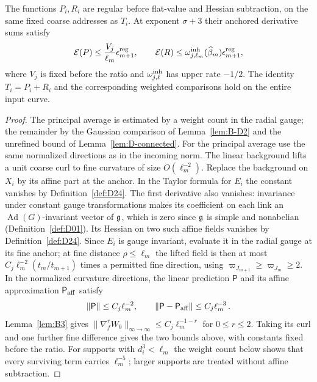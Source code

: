 \begin{lemma}\label{lem:D-inherited}
The functions $P_i,R_i$ are regular before flat-value and Hessian subtraction, on the same fixed coarse addresses as $T_i$. At exponent $\sigma+3$ their anchored derivative sums satisfy
\begin{equation*}
\mathcal E(P)\le\frac{V_j}{\ell_m}\epsilon_{m+1}^{\rm reg},\qquad
\mathcal E(R)\le \omega_{j,\ell_m}^{\rm inh}(\widehat{\beta}_m)\epsilon_{m+1}^{\rm reg},
\end{equation*}
where $V_j$ is fixed before the ratio and $\omega_{j,\ell}^{\rm inh}$ has upper rate $-1/2$. The identity $T_i=P_i+R_i$ and the corresponding weighted comparisons hold on the entire input curve.
\end{lemma}
\begin{proof}
The principal average is estimated by a weight count in the radial gauge; the remainder by the Gaussian comparison of Lemma~\ref{lem:B-D2} and the unrefined bound of Lemma~\ref{lem:D-connected}. For the principal average use the same normalized directions as in the incoming norm. The linear background lifts a unit coarse curl to fine curvature of size $O(\ell_m^{-2})$. Replace the background on $X_i$ by its affine part at the anchor. In the Taylor formula for $E_i$ the constant vanishes by Definition~\ref{def:D24}. The first derivative also vanishes: invariance under constant gauge transformations makes its coefficient on each link an $\operatorname{Ad}(G)$-invariant vector of $\mathfrak{g}$, which is zero since $\mathfrak{g}$ is simple and nonabelian (Definition~\ref{def:D01}). Its Hessian on two such affine fields vanishes by Definition~\ref{def:D24}. Since $E_i$ is gauge invariant, evaluate it in the radial gauge at its fine anchor; at fine distance $\rho\le\ell_m$ the lifted field is then at most $C_j\ell_m^{-2}(t_m/t_{m+1})$ times a permitted fine direction, using $\varpi_{J_{m+1}}\ge\varpi_{J_m}\ge2$. In the normalized curvature directions, the linear prediction $\mathsf P$ and its affine approximation $\mathsf P_{\rm aff}$ satisfy
\begin{equation*}
\|\mathsf P\|\le C_j\ell_m^{-2},\qquad
\|\mathsf P-\mathsf P_{\rm aff}\|\le C_j\ell_m^{-3}\,.
\end{equation*}
Lemma~\ref{lem:B3} gives $\|\nabla_f^rW_0\|_{\infty\to\infty}\le C_j\ell_m^{-1-r}$ for $0\le r\le2$. Taking its curl and one further fine difference gives the two bounds above, with constants fixed before the ratio. For supports with $d_i^3<\ell_m$ the weight count below shows that every surviving term carries $\ell_m^{-5}$; larger supports are treated without affine subtraction.


\end{proof}
